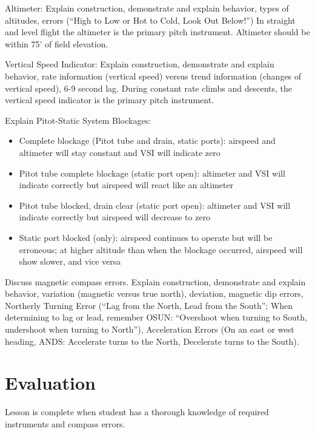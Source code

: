 \documentclass[twoside,openright]{report}
\begin{document}
Altimeter: Explain construction, demonstrate and explain behavior, types of
altitudes, errors (``High to Low or Hot to Cold, Look Out Below!'') In straight
and level flight the altimeter is the primary pitch instrument. Altimeter
should be within 75' of field elevation.

Vertical Speed Indicator: Explain construction, demonstrate and explain
behavior, rate information (vertical speed) versus trend information (changes
of vertical speed), 6-9 second lag. During constant rate climbs and descents,
the vertical speed indicator is the primary pitch instrument.

Explain Pitot-Static System Blockages:
\begin{itemize}
  \item Complete blockage (Pitot tube and drain, static ports): airspeed and
    altimeter will stay constant and VSI will indicate zero

  \item Pitot tube complete blockage (static port open): altimeter and VSI will
    indicate correctly but airspeed will react like an altimeter

  \item Pitot tube blocked, drain clear (static port open): altimeter and VSI
    will indicate correctly but airspeed will decrease to zero

  \item Static port blocked (only): airspeed continues to operate but will be
    erroneous; at higher altitude than when the blockage occurred, airspeed
    will show slower, and vice versa
\end{itemize}

Discuss magnetic compass errors. Explain construction, demonstrate and explain
behavior, variation (magnetic versus true north), deviation, magnetic dip
errors, Northerly Turning Error (``Lag from the North, Lead from the South'';
When determining to lag or lead, remember OSUN: ``Overshoot when turning to
South, undershoot when turning to North''), Acceleration Errors (On an east or
west heading, ANDS: Accelerate turns to the North, Decelerate turns to the
South).

\section{Evaluation}

Lesson is complete when student has a thorough knowledge of required
instruments and compass errors.
\end{document}
